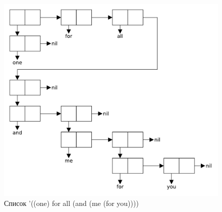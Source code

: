 \begin{enumerate}
\begin{figure}[H]
            \includegraphics[scale=0.75]{data/pdf/01-06.pdf}
            \caption{Список '((one) for all (and (me (for you))))}
        \end{figure}
\end{enumerate}

